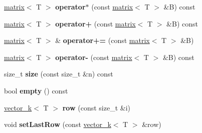 \begin{DoxyCompactItemize}
\item 
\hypertarget{classkeycpp_1_1matrix_add1f4ca03e1cce57574c905ab7ca89fe}{\hyperlink{classkeycpp_1_1matrix}{matrix}$<$ T $>$ {\bfseries operator$\ast$} (const \hyperlink{classkeycpp_1_1matrix}{matrix}$<$ T $>$ \&B) const }\label{classkeycpp_1_1matrix_add1f4ca03e1cce57574c905ab7ca89fe}

\item 
\hypertarget{classkeycpp_1_1matrix_a8c0520cf5064379afa5128cf7f660832}{\hyperlink{classkeycpp_1_1matrix}{matrix}$<$ T $>$ {\bfseries operator+} (const \hyperlink{classkeycpp_1_1matrix}{matrix}$<$ T $>$ \&B) const }\label{classkeycpp_1_1matrix_a8c0520cf5064379afa5128cf7f660832}

\item 
\hypertarget{classkeycpp_1_1matrix_a78655e73267b48e16909a68291f4c074}{\hyperlink{classkeycpp_1_1matrix}{matrix}$<$ T $>$ \& {\bfseries operator+=} (const \hyperlink{classkeycpp_1_1matrix}{matrix}$<$ T $>$ \&B)}\label{classkeycpp_1_1matrix_a78655e73267b48e16909a68291f4c074}

\item 
\hypertarget{classkeycpp_1_1matrix_a1c6cb00f8859e6486a7054f11b1c7e6a}{\hyperlink{classkeycpp_1_1matrix}{matrix}$<$ T $>$ {\bfseries operator-\/} (const \hyperlink{classkeycpp_1_1matrix}{matrix}$<$ T $>$ \&B) const }\label{classkeycpp_1_1matrix_a1c6cb00f8859e6486a7054f11b1c7e6a}

\item 
\hypertarget{classkeycpp_1_1matrix_ab1844162a6b015001d1295629ed8978c}{size\-\_\-t {\bfseries size} (const size\-\_\-t \&n) const }\label{classkeycpp_1_1matrix_ab1844162a6b015001d1295629ed8978c}

\item 
\hypertarget{classkeycpp_1_1matrix_ad522f701e86eafc344d8904d4f0a8f19}{bool {\bfseries empty} () const }\label{classkeycpp_1_1matrix_ad522f701e86eafc344d8904d4f0a8f19}

\item 
\hypertarget{classkeycpp_1_1matrix_ace5c8485795a33d10d1cd58ca6636b68}{\hyperlink{classkeycpp_1_1vector__k}{vector\-\_\-k}$<$ T $>$ {\bfseries row} (const size\-\_\-t \&i)}\label{classkeycpp_1_1matrix_ace5c8485795a33d10d1cd58ca6636b68}

\item 
\hypertarget{classkeycpp_1_1matrix_a5fc527ff5096ff162580db9c9eb1637e}{void {\bfseries set\-Last\-Row} (const \hyperlink{classkeycpp_1_1vector__k}{vector\-\_\-k}$<$ T $>$ \&row)}\label{classkeycpp_1_1matrix_a5fc527ff5096ff162580db9c9eb1637e}


\end{DoxyCompactItemize}
